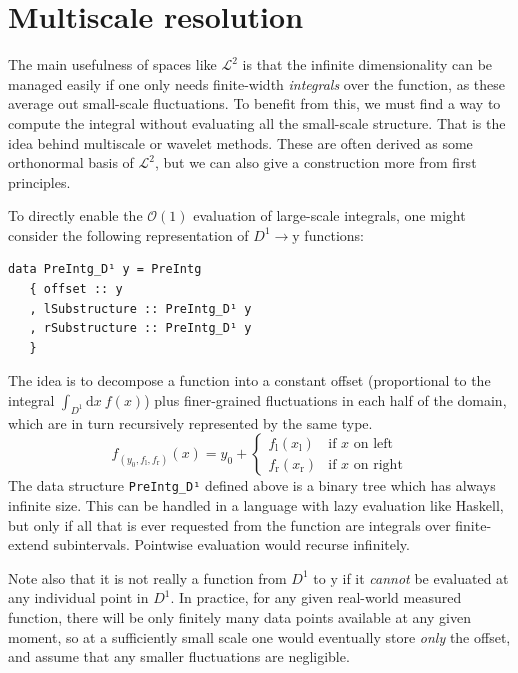 \documentclass[final,sigplan,review,anonymous]{acmart}\settopmatter{printfolios=true,printccs=false,printacmref=false}
\theoremstyle{acmplain}
\theoremstyle{acmdefinition}
\begin{document}
\section{Multiscale resolution}\label{mulScaleResoIntro}
The main usefulness of spaces like $\mathcal{L}^2$ is that the infinite dimensionality can be managed easily if one only needs finite-width \emph{integrals} over the function, as these average out small-scale fluctuations.
To benefit from this, we must find a way to compute the integral without evaluating all the small-scale structure.
That is the idea behind multiscale or wavelet methods.
These are often derived as some orthonormal basis of $\mathcal{L}^2$, but we can also give a construction more from first principles.

To directly enable the $\mathcal{O}(1)$ evaluation of large-scale integrals, one might consider the following representation of $D^1\to \mathrm{y}$ functions:
\begin{lstlisting}
data PreIntg_D¹ y = PreIntg
   { offset :: y
   , lSubstructure :: PreIntg_D¹ y
   , rSubstructure :: PreIntg_D¹ y
   }
\end{lstlisting}
The idea is to decompose a function into a constant offset (proportional to the integral $\int_{D^1}\!\mathrm{d}x\:f(x)$) plus finer-grained fluctuations in each half of the domain, which are in turn recursively represented by the same type.
\[
  f_{(y_0,f_\mathrm{l},f_\mathrm{r})}(x)
      = y_0 + \begin{cases}
                 f_\mathrm{l}(x_\mathrm{l}) & \text{if $x$ on left}
              \\ f_\mathrm{r}(x_\mathrm{r}) & \text{if $x$ on right}
              \end{cases}
\]
The data structure \lstinline`PreIntg_D¹` defined above is a binary tree which has always infinite size.
This can be handled in a language with lazy evaluation like Haskell,
but only if all that is ever requested from the function are integrals over finite-extend subintervals.
Pointwise evaluation would recurse infinitely.

Note also that it is not really a function from $D^1$ to $\mathrm{y}$ if it \emph{cannot} be evaluated at any individual point in $D^1$.
In practice, for any given real-world measured function, there will be only finitely many data points available at any given moment,
so at a sufficiently small scale one would eventually store \emph{only} the offset,
and assume that any smaller fluctuations are negligible.
\end{document}
